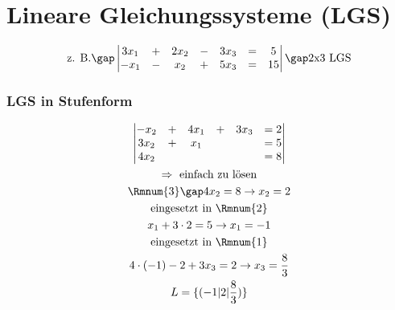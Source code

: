 \newpage
\section{Lineare Gleichungssysteme (LGS)}
\begin{gather*}
  \text{z. B.} \gap
  \begin{vmatrix}
    3x_1 & + & 2x_2 & - & 3x_3 & = & 5 \\
    -x_1 & - & x_2 & + & 5x_3 & = & 15
  \end{vmatrix}
  \gap \text{2x3 LGS}
\end{gather*}
\subsubsection{LGS in Stufenform}
\begin{gather*}
  \begin{vmatrix}
    -x_2 & + & 4x_1 & + & 3x_3 & = 2 \\
    3x_2 & + & x_1 &&&  = 5 \\
    4x_2 &&&&& = 8
  \end{vmatrix} \\
  \Rightarrow \text{ einfach zu lösen} \\
  \text{\Rmnum{3}} \gap 4x_2 = 8 \rightarrow x_2 = 2 \\
  \text{eingesetzt in \Rmnum{2}} \\
  x_1 + 3 \cdot 2 = 5 \rightarrow x_1 = -1 \\
  \text{eingesetzt in \Rmnum{1}} \\
  4 \cdot (-1) -2 + 3x_3 = 2 \rightarrow x_3 = \frac{8}{3} \\
  L = \{(-1|2|\frac{8}{3})\}
\end{gather*}
